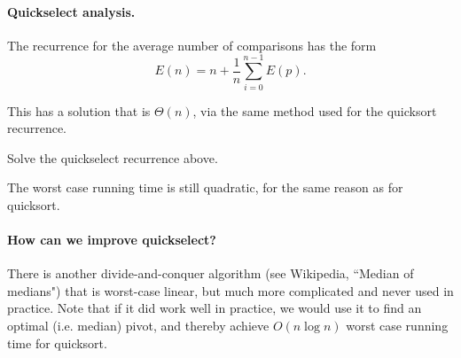 \paragraph{Quickselect analysis.}

The recurrence for the average number of comparisons has the form 
$$E(n) = n + \frac{1}{n} \sum_{i=0}^{n-1} E(p).$$

This has a solution that is 
$\Theta(n)$, via the same method used for the quicksort recurrence.

\begin{Boxample}[5]

Solve the quickselect recurrence above.
\end{Boxample}

The worst case running time is still quadratic, for the same reason as for quicksort.

\paragraph{How can we improve quickselect?}

There is another divide-and-conquer 
algorithm (see Wikipedia, ``Median of medians")  that is worst-case linear, but much more complicated and never used in practice. Note that if it did work well in practice, we would use it to find an optimal (i.e. median) pivot, and thereby achieve $O(n\log n)$ worst case running time for quicksort.


